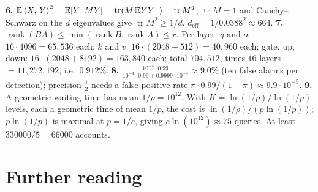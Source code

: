 \textbf{6.} $\mathbb{E}\left\langle X,\,Y\right\rangle^2=\mathbb{E}[Y^{\!\top}MY]=\operatorname{tr}(M\,\mathbb{E} YY^{\!\top})=\operatorname{tr}M^2$; $\operatorname{tr}M=1$ and Cauchy--Schwarz on the $d$ eigenvalues give $\operatorname{tr}M^2\ge1/d$. $d_{\mathrm{eff}}=1/0.0388^2\approx664$. \quad
\textbf{7.} $\operatorname{rank}(BA)\le\min(\operatorname{rank}B,\operatorname{rank}A)\le r$. Per layer: $q$ and $o$: $16\cdot4096=65{,}536$ each; $k$ and $v$: $16\cdot(2048+512)=40{,}960$ each; gate, up, down: $16\cdot(2048+8192)=163{,}840$ each; total $704{,}512$, times $16$ layers $=11{,}272{,}192$, i.e.\ $0.912\%$. \quad
\textbf{8.} $\frac{10^{-4}\cdot0.99}{10^{-4}\cdot0.99+0.9999\cdot10^{-3}}\approx9.0\%$ (ten false alarms per detection); precision $\frac12$ needs a false-positive rate $\pi\cdot0.99/(1-\pi)\approx9.9\cdot10^{-5}$. \quad
\textbf{9.} A geometric waiting time has mean $1/\rho=10^{12}$. With $K=\ln(1/\rho)/\ln(1/p)$ levels, each a geometric time of mean $1/p$, the cost is $\ln(1/\rho)/(p\ln(1/p))$; $p\ln(1/p)$ is maximal at $p=1/e$, giving $e\ln(10^{12})\approx75$ queries. At least $330000/5=66000$ accounts.

\normalsize

\chapter*{Further reading}
